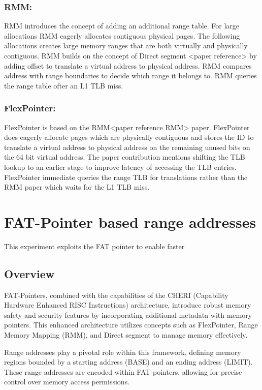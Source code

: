\documentclass[acmsmall,screen,review]{acmart}
\begin{document}
\subsubsection{RMM:}
RMM introduces the concept of adding an additional range table.
For large allocations RMM eagerly allocates contiguous physical pages.
The following allocations creates large memory ranges that are
both virtually and physically contiguous. RMM builds on the concept
of Direct segment <paper reference> by adding offset to translate a virtual address 
to physical address. RMM compares address with range boundaries 
to decide which range it belongs to. RMM queries the range table 
ofter an L1 TLB miss.

\subsubsection{FlexPointer:}
FlexPointer is based on the RMM<paper reference RMM> paper. FlexPointer
does eagerly allocate pages which are physically contiguous and stores the ID to translate a virtual address 
to physical address on the remaining unused bits on the 64 bit virtual address. 
The paper contribution mentions shifting the TLB lookup to an earlier stage to improve
latency of accessing the TLB entries. FlexPointer immediate queries the 
range TLB for translations rather than the RMM paper which waits for the L1 TLB miss.

\section{FAT-Pointer based range addresses}
This experiment exploits the FAT pointer to enable faster

\subsection{Overview}
FAT-Pointers, combined with the capabilities of the CHERI (Capability Hardware Enhanced RISC Instructions) 
architecture, introduce robust memory safety and security features by incorporating additional metadata 
with memory pointers. This enhanced architecture utilizes concepts such as FlexPointer, 
Range Memory Mapping (RMM), and Direct segment to manage memory effectively.

Range addresses play a pivotal role within this framework, defining memory 
regions bounded by a starting address (BASE) and an ending address (LIMIT). 
These range addresses are encoded within FAT-pointers, allowing for precise 
control over memory access permissions.
\end{document}
